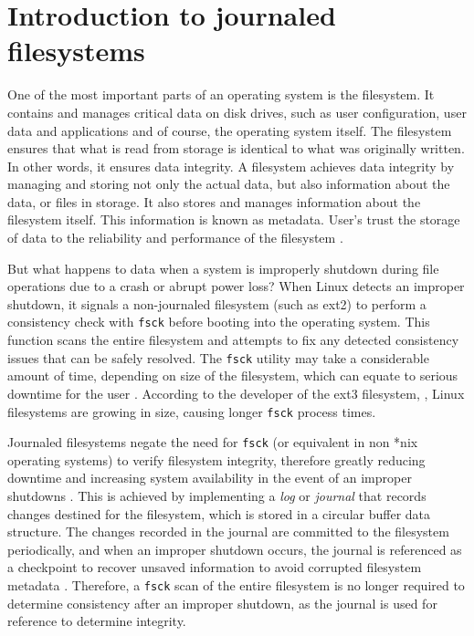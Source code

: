 \section{Introduction to journaled filesystems}

One of the most important parts of an operating system is the filesystem. It contains and manages critical data on disk drives, such as user configuration, user data and applications and of course, the operating system itself. The filesystem ensures that what is read from storage is identical to what was originally written. In other words, it ensures data integrity. A filesystem achieves data integrity by managing and storing not only the actual data, but also information about the data, or files in storage. It also stores and manages information about the filesystem itself. This information is known as metadata. User's trust the storage of data to the reliability and performance of the filesystem \citep{Best2002}.

But what happens to data when a system is improperly shutdown during file operations due to a crash or abrupt power loss? When Linux detects an improper shutdown, it signals a non-journaled filesystem (such as ext2) to perform a consistency check with \texttt{fsck} before booting into the operating system. This function scans the entire filesystem and attempts to fix any detected consistency issues that can be safely resolved. The \texttt{fsck} utility may take a considerable amount of time, depending on size of the filesystem, which can equate to serious downtime for the user \citep{Jones2008}. According to the developer of the ext3 filesystem, \citet{Tweedie2000}, Linux filesystems are growing in size, causing longer \texttt{fsck} process times.

Journaled filesystems negate the need for \texttt{fsck} (or equivalent in non *nix operating systems) to verify filesystem integrity, therefore greatly reducing downtime and increasing system availability in the event of an improper shutdowns \citep{Best2002, Bost2012, Jones2008, Prabhakaran2005a, Tweedie1998, Tweedie2000}. This is achieved by implementing a \emph{log} or \emph{journal} that records changes destined for the filesystem, which is stored in a circular buffer data structure. The changes recorded in the journal are committed to the filesystem periodically, and when an improper shutdown occurs, the journal is referenced as a checkpoint to recover unsaved information to avoid corrupted filesystem metadata \citep{Jones2008}. Therefore, a \texttt{fsck} scan of the entire filesystem is no longer required to determine consistency after an improper shutdown, as the journal is used for reference to determine integrity.